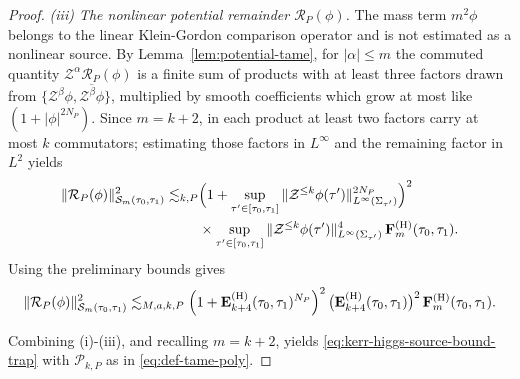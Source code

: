 \documentclass[11pt]{article}
\numberwithin{equation}{section}
\theoremstyle{plain}
\theoremstyle{definition}
\theoremstyle{remark}
\begin{document}
\begin{proof}
\smallskip\noindent
\emph{(iii) The nonlinear potential remainder $\mathcal R_P(\phi)$.}
The mass term $m^{2}\phi$ belongs to the linear Klein-Gordon comparison operator and is not estimated as a nonlinear source. By Lemma~\ref{lem:potential-tame}, for $|\alpha|\le m$ the commuted quantity $\mathcal Z^\alpha\mathcal R_P(\phi)$ is a finite sum of products with at least three factors drawn from $\{\mathcal Z^{\beta}\phi,\overline{\mathcal Z^{\beta}\phi}\}$,
multiplied by smooth coefficients which grow at most like $(1+|\phi|^{2N_P})$.
Since $m=k+2$, in each product at least two factors carry at most $k$ commutators; estimating those factors in $L^\infty$ and the remaining factor in $L^2$ yields
\begin{eqnarray}
\|\mathcal R_P(\phi)\|_{\mathcal S_{m}(\tau_0,\tau_1)}^{2}
\lesssim_{k,P}
&\Bigl(1+\sup_{\tau'\in[\tau_0,\tau_1]}\|\mathcal Z^{\le k}\phi(\tau')\|_{L^\infty(\Sigma_{\tau'})}^{2N_P}\Bigr)^{2}\\
&\times
\sup_{\tau'\in[\tau_0,\tau_1]}\|\mathcal Z^{\le k}\phi(\tau')\|_{L^\infty(\Sigma_{\tau'})}^{4}\,
\mathbf F_{m}^{(\mathrm H)}(\tau_0,\tau_1).
\end{eqnarray}
Using the preliminary bounds gives
\begin{equation}
\|\mathcal R_P(\phi)\|_{\mathcal S_{m}(\tau_0,\tau_1)}^{2}
\lesssim_{M,a,k,P}
\Bigl(1+\mathbf E_{k+4}^{(\mathrm H)}(\tau_0,\tau_1)^{N_P}\Bigr)^{2}\,
\bigl(\mathbf E_{k+4}^{(\mathrm H)}(\tau_0,\tau_1)\bigr)^{2}\,
\mathbf F_{m}^{(\mathrm H)}(\tau_0,\tau_1).
\end{equation}

\smallskip
Combining (i)-(iii), and recalling $m=k+2$, yields \eqref{eq:kerr-higgs-source-bound-trap} with $\mathcal P_{k,P}$ as in \eqref{eq:def-tame-poly}.
\end{proof}
\end{document}
